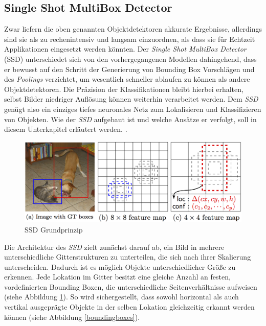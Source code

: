 \subsection{Single Shot MultiBox Detector}

Zwar liefern die oben genannten Objektdetektoren akkurate Ergebnisse, allerdings sind sie als zu rechenintensiv und langsam einzuordnen, als dass sie für Echtzeit Applikationen eingesetzt werden könnten. Der \textit{Single Shot MultiBox Detector} (SSD) unterschiedet sich von den vorhergegangenen Modellen dahingehend, dass er bewusst auf den Schritt der Generierung von Bounding Box Vorschlägen und des \textit{Poolings} verzichtet, um wesentlich schneller ablaufen zu können als andere Objektdetektoren. Die Präzision der Klassifikationen bleibt hierbei erhalten, selbst Bilder niedriger Auflösung können weiterhin verarbeitet werden. Dem \textit{SSD} genügt also ein einziges tiefes neuronales Netz zum Lokalisieren und Klassifizieren von Objekten. Wie der \textit{SSD} aufgebaut ist und welche Ansätze er verfolgt, soll in diesem Unterkapitel erläutert werden. \cite{ssd.20161229}. 

\begin{figure}[ht]
	\begin{center}
		\includegraphics[width=15cm]{Bilder/ssd_framework.png} 
		\caption[SSD Grundprinzip]{SSD Grundprinzip \cite{ssd.20161229}}
		\label{framework}
	\end{center}
\end{figure}

Die Architektur des \textit{SSD} zielt zunächst darauf ab, ein Bild in mehrere unterschiedliche Gitterstrukturen zu unterteilen, die sich nach ihrer Skalierung unterscheiden. Dadurch ist es möglich Objekte unterschiedlicher Größe zu erkennen. Jede Lokation im Gitter besitzt eine gleiche Anzahl an festen, vordefinierten Bounding Boxen, die unterschiedliche Seitenverhältnisse aufweisen (siehe Abbildung \ref{framework}). So wird sichergestellt, dass sowohl horizontal als auch vertikal ausgeprägte Objekte in der selben Lokation gleichzeitig erkannt werden können (siehe Abbildung \ref{boundingboxes}). \cite{ssd.20161229}

